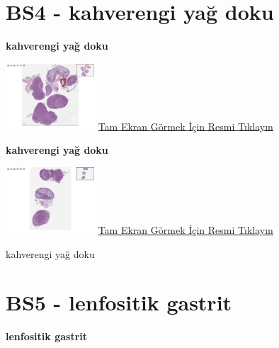 \documentclass[
  letterpaper,
  DIV=11,
  numbers=noendperiod]{scrreprt}
\begin{document}
\hypertarget{sec-BS4}{%
\section{BS4 - kahverengi yağ doku}\label{sec-BS4}}

\textbf{kahverengi yağ doku}

\href{https://images.patolojiatlasi.com/BS4/HE1.html}{\includegraphics[width=0.25\textwidth,height=\textheight]{./screenshots/BS4-HE1_screenshot.png}}
\href{https://images.patolojiatlasi.com/BS4/HE1.html}{Tam Ekran Görmek
İçin Resmi Tıklayın}

\textbf{kahverengi yağ doku}

\href{https://images.patolojiatlasi.com/BS4/HE2.html}{\includegraphics[width=0.25\textwidth,height=\textheight]{./screenshots/BS4-HE2_screenshot.png}}
\href{https://images.patolojiatlasi.com/BS4/HE2.html}{Tam Ekran Görmek
İçin Resmi Tıklayın}

\begin{tcolorbox}[enhanced jigsaw, left=2mm, toprule=.15mm, rightrule=.15mm, bottomrule=.15mm, leftrule=.75mm, colback=white, colframe=quarto-callout-tip-color-frame, toptitle=1mm, breakable, titlerule=0mm, colbacktitle=quarto-callout-tip-color!10!white, bottomtitle=1mm, title=\textcolor{quarto-callout-tip-color}{\faLightbulb}\hspace{0.5em}{Tanı}, arc=.35mm, opacitybacktitle=0.6, opacityback=0, coltitle=black]

kahverengi yağ doku

\end{tcolorbox}

\hypertarget{sec-BS5}{%
\section{BS5 - lenfositik gastrit}\label{sec-BS5}}

\textbf{lenfositik gastrit}
\end{document}
